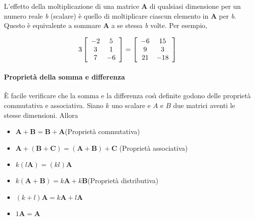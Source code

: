 L'effetto della moltiplicazione di una matrice $\boldsymbol{A}$ di
    qualsiasi dimensione per un numero reale \emph{b} (scalare) {\`e}
    quello di moltiplicare ciascun elemento in $\boldsymbol{A}$ per \emph{b}. Questo {\`e} equivalente a sommare $\boldsymbol{A}$ a se stessa  \emph{b} volte.
Per esempio,

\begin{displaymath}
3 \left[ \begin{array}{c c}
-2 & 5\\
3 & 1\\
7 & -6
\end{array}
 \right]=
\left[ \begin{array}{c c}
-6 & 15\\
9 & 3\\
21 & -18
\end{array}
 \right]
\end{displaymath}

\paragraph{Propriet{\`a} della somma e differenza}

{\`E} facile verificare che la somma e la differenza cos{\`\i}
definite godono delle propriet{\`a} commutativa e associativa.
 Siano $k$ uno scalare e $A$ e $B$ due matrici aventi le stesse
dimensioni. Allora

\begin{itemize}

\item $\boldsymbol{A}+ \boldsymbol{B} = \boldsymbol{B} +
\boldsymbol{A}$\quad (Propriet{\`a} commutativa)

\item $\boldsymbol{A} + (\boldsymbol{B} + \boldsymbol{C}) =
(\boldsymbol{A} + \boldsymbol{B}) + \boldsymbol{C}$\quad
(Propriet{\`a} associativa)

\item $k(l\boldsymbol{A}) = (kl)\boldsymbol{A}$

\item $k(\boldsymbol{A} + \boldsymbol{B}) = k\boldsymbol{A} +
k\boldsymbol{B}$\quad (Propriet{\`a} distributiva)

\item $(k+l)\boldsymbol{A} = k\boldsymbol{A} + l\boldsymbol{A}$

\item $1\boldsymbol{A} = \boldsymbol{A}$\quad
\end{itemize}


